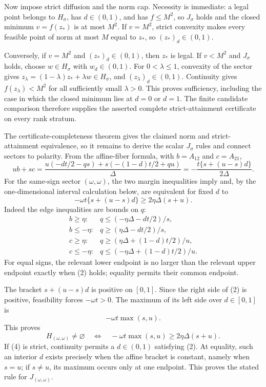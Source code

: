 Now impose strict diffusion and the norm cap.  Necessity is immediate: a legal point belongs to \(H_{\sigma}\), has \(d\in(0,1)\), and has \(f\le M^2\), so \(J_{\sigma}\) holds and the closed minimum \(v=f(z_*)\) is at most \(M^2\).  If \(v=M^2\), strict convexity makes every feasible point of norm at most \(M\) equal to \(z_*\), so \((z_*)_d\in(0,1)\).

Conversely, if \(v=M^2\) and \((z_*)_d\in(0,1)\), then \(z_*\) is legal.  If \(v<M^2\) and \(J_{\sigma}\) holds, choose \(w\in H_{\sigma}\) with \(w_d\in(0,1)\).  For \(0<\lambda\le1\), convexity of the sector gives \(z_{\lambda}=(1-\lambda)z_*+\lambda w\in H_{\sigma}\), and \((z_{\lambda})_d\in(0,1)\).  Continuity gives \(f(z_{\lambda})<M^2\) for all sufficiently small \(\lambda>0\).  This proves sufficiency, including the case in which the closed minimum lies at \(d=0\) or \(d=1\).  The finite candidate comparison therefore supplies the asserted complete strict-attainment certificate on every rank stratum.

The certificate-completeness theorem gives the claimed norm and strict-attainment equivalence, so it remains to derive the scalar \(J_{\sigma}\) rules and connect sectors to polarity.  From the affine-fiber formula, with \(b=A_{12}\) and \(c=A_{21}\),
\[
 ub+sc
 =\frac{u(-dt/2-qs)+s(-(1-d)t/2+qu)}{\Delta}
 =-\frac{t\{s+(u-s)d\}}{2\Delta}. \tag{1}
\]
For the same-sign sector \((\omega,\omega)\), the two margin inequalities imply and, by the one-dimensional interval calculation below, are equivalent for fixed \(d\) to
\[
 -\omega t\{s+(u-s)d\}\ge 2\eta\Delta(s+u). \tag{2}
\]
Indeed the edge inequalities are bounds on \(q\):
\[
\begin{array}{ll}
b\ge\eta:&q\le(-\eta\Delta-dt/2)/s,\\
b\le-\eta:&q\ge(\eta\Delta-dt/2)/s,\\
c\ge\eta:&q\ge(\eta\Delta+(1-d)t/2)/u,\\
c\le-\eta:&q\le(-\eta\Delta+(1-d)t/2)/u.
\end{array} \tag{3}
\]
For equal signs, the relevant lower endpoint is no larger than the relevant upper endpoint exactly when (2) holds; equality permits their common endpoint.

The bracket \(s+(u-s)d\) is positive on \([0,1]\).  Since the right side of (2) is positive, feasibility forces \(-\omega t>0\).  The maximum of its left side over \(d\in[0,1]\) is
\[
 -\omega t\max(s,u).
\]
This proves
\[
 H_{(\omega,\omega)}\ne\varnothing
 \quad\Longleftrightarrow\quad
 -\omega t\max(s,u)\ge2\eta\Delta(s+u). \tag{4}
\]
If (4) is strict, continuity permits a \(d\in(0,1)\) satisfying (2).  At equality, such an interior \(d\) exists precisely when the affine bracket is constant, namely when \(s=u\); if \(s\ne u\), its maximum occurs only at one endpoint.  This proves the stated rule for \(J_{(\omega,\omega)}\).

